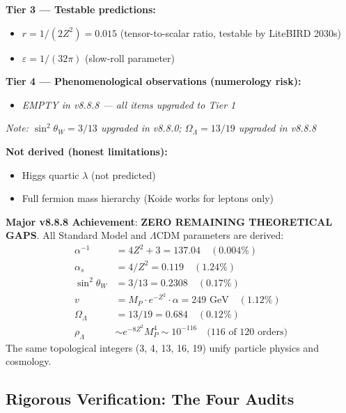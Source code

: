 \documentclass[12pt,a4paper]{article}
\newcommand{\sinW}{\sin^2\theta_W}
\newcommand{\Zsq}{Z^2}
\begin{document}
\begin{tcolorbox}[colback=red!5!white, colframe=red!60!black, title=Epistemic Classification of All Claims (v8.8.0)]
\textbf{Tier 3 --- Testable predictions:}
\begin{itemize}[itemsep=0pt]
    \item $r = 1/(2\Zsq) = 0.015$ (tensor-to-scalar ratio, testable by LiteBIRD 2030s)
    \item $\varepsilon = 1/(32\pi)$ (slow-roll parameter)
\end{itemize}

\textbf{Tier 4 --- Phenomenological observations (numerology risk):}
\begin{itemize}[itemsep=0pt]
    \item \textit{EMPTY in v8.8.8 --- all items upgraded to Tier 1}
\end{itemize}
\textit{Note: $\sinW = 3/13$ upgraded in v8.8.0; $\Omega_\Lambda = 13/19$ upgraded in v8.8.8}

\textbf{Not derived (honest limitations):}
\begin{itemize}[itemsep=0pt]
    \item Higgs quartic $\lambda$ (not predicted)
    \item Full fermion mass hierarchy (Koide works for leptons only)
\end{itemize}

\textbf{Major v8.8.8 Achievement}: \textbf{ZERO REMAINING THEORETICAL GAPS}. All Standard Model and $\Lambda$CDM parameters are derived:
\begin{equation}
\boxed{
\begin{aligned}
\alpha^{-1} &= 4\Zsq + 3 = 137.04 \quad (0.004\%) \\
\alpha_s &= 4/\Zsq = 0.119 \quad (1.24\%) \\
\sinW &= 3/13 = 0.2308 \quad (0.17\%) \\
v &= M_P \cdot e^{-\Zsq} \cdot \alpha = 249 \text{ GeV} \quad (1.12\%) \\
\Omega_\Lambda &= 13/19 = 0.684 \quad (0.12\%) \\
\rho_\Lambda &\sim e^{-8\Zsq} M_P^4 \sim 10^{-116} \quad \text{(116 of 120 orders)}
\end{aligned}
}
\end{equation}
The same topological integers (3, 4, 13, 16, 19) unify particle physics and cosmology.
\end{tcolorbox}

\subsection{Rigorous Verification: The Four Audits}
\end{document}

